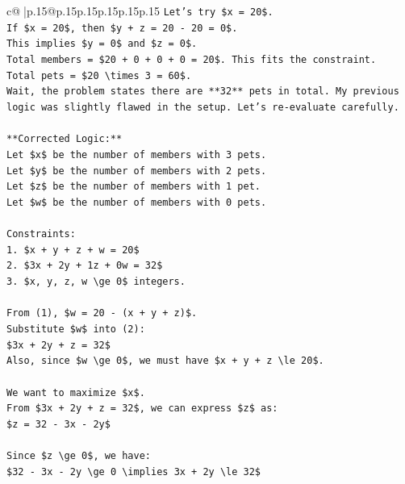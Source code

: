 \documentclass{article}
\begin{document}
{\begin{supertabular}{c@{$\;$}|p{.15\linewidth}@{}p{.15\linewidth}p{.15\linewidth}p{.15\linewidth}p{.15\linewidth}p{.15\linewidth}}
{{{\texttt{Let's try \$x = 20\$.} \\
\texttt{If \$x = 20\$, then \$y + z = 20 {-} 20 = 0\$.} \\
\texttt{This implies \$y = 0\$ and \$z = 0\$.} \\
\texttt{Total members = \$20 + 0 + 0 + 0 = 20\$. This fits the constraint.} \\
\texttt{Total pets = \$20 \textbackslash{}times 3 = 60\$.} \\
\texttt{Wait, the problem states there are **32** pets in total. My previous logic was slightly flawed in the setup. Let's re{-}evaluate carefully.} \\
\\ 
\texttt{**Corrected Logic:**} \\
\texttt{Let \$x\$ be the number of members with 3 pets.} \\
\texttt{Let \$y\$ be the number of members with 2 pets.} \\
\texttt{Let \$z\$ be the number of members with 1 pet.} \\
\texttt{Let \$w\$ be the number of members with 0 pets.} \\
\\ 
\texttt{Constraints:} \\
\texttt{1. \$x + y + z + w = 20\$} \\
\texttt{2. \$3x + 2y + 1z + 0w = 32\$} \\
\texttt{3. \$x, y, z, w \textbackslash{}ge 0\$ integers.} \\
\\ 
\texttt{From (1), \$w = 20 {-} (x + y + z)\$.} \\
\texttt{Substitute \$w\$ into (2):} \\
\texttt{\$3x + 2y + z = 32\$} \\
\texttt{Also, since \$w \textbackslash{}ge 0\$, we must have \$x + y + z \textbackslash{}le 20\$.} \\
\\ 
\texttt{We want to maximize \$x\$.} \\
\texttt{From \$3x + 2y + z = 32\$, we can express \$z\$ as:} \\
\texttt{\$z = 32 {-} 3x {-} 2y\$} \\
\\ 
\texttt{Since \$z \textbackslash{}ge 0\$, we have:} \\
\texttt{\$32 {-} 3x {-} 2y \textbackslash{}ge 0 \textbackslash{}implies 3x + 2y \textbackslash{}le 32\$} \\
\\ 
}}}
\end{supertabular}}
\end{document}
